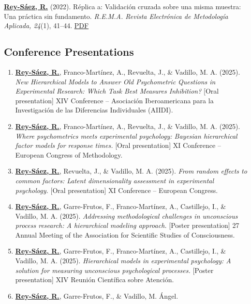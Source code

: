 \documentclass[
  letterpaper,
  DIV=11,
  numbers=noendperiod]{scrartcl}
\providecommand{\tightlist}{%
  \setlength{\itemsep}{0pt}\setlength{\parskip}{0pt}}
\begin{document}
\ul{\textbf{Rey-Sáez, R.}} (2022). Réplica a: Validación cruzada sobre
una misma muestra: Una práctica sin fundamento. \emph{R.E.M.A. Revista
Electrónica de Metodología Aplicada, 24}(1), 41--44.
\href{https://reunido.uniovi.es/index.php/Rema/article/view/17634}{PDF}

\subsection{\texorpdfstring{ Conference
Presentations}{ Conference Presentations}}\label{conference-presentations}

\begin{enumerate}
\def\labelenumi{\arabic{enumi}.}
\tightlist
\item
  \ul{\textbf{Rey-Sáez, R.}}, Franco-Martínez, A., Revuelta, J., \&
  Vadillo, M. A. (2025). \emph{New Hierarchical Models to Answer Old
  Psychometric Questions in Experimental Research: Which Task Best
  Measures Inhibition?} {[}Oral presentation{]} XIV Conference --
  Asociación Iberoamericana para la Investigación de las Diferencias
  Individuales (AIIDI).
\item
  \ul{\textbf{Rey-Sáez, R.}}, Franco-Martínez, A., Revuelta, J., \&
  Vadillo, M. A. (2025). \emph{Where psychometrics meets experimental
  psychology: Bayesian hierarchical factor models for response times.}
  {[}Oral presentation{]} XI Conference -- European Congress of
  Methodology.
\item
  \ul{\textbf{Rey-Sáez, R.}}, Revuelta, J., \& Vadillo, M. A. (2025).
  \emph{From random effects to common factors: Latent dimensionality
  assessment in experimental psychology.} {[}Oral presentation{]} XI
  Conference -- European Congress.
\item
  \ul{\textbf{Rey-Sáez, R.}}, Garre-Frutos, F., Franco-Martínez, A.,
  Castillejo, I., \& Vadillo, M. A. (2025). \emph{Addressing
  methodological challenges in unconscious process research: A
  hierarchical modeling approach.} {[}Poster presentation{]} 27 Annual
  Meeting of the Association for Scientific Studies of Consciousness.
\item
  \ul{\textbf{Rey-Sáez, R.}}, Garre-Frutos, F., Franco-Martínez, A.,
  Castillejo, I., \& Vadillo, M. A. (2025). \emph{Hierarchical models in
  experimental psychology: A solution for measuring unconscious
  psychological processes.} {[}Poster presentation{]} XIV Reunión
  Científica sobre Atención.
\item
  \ul{\textbf{Rey-Sáez, R.}}, Garre-Frutos, F., \& Vadillo, M. Ángel.

\end{enumerate}
\end{document}
